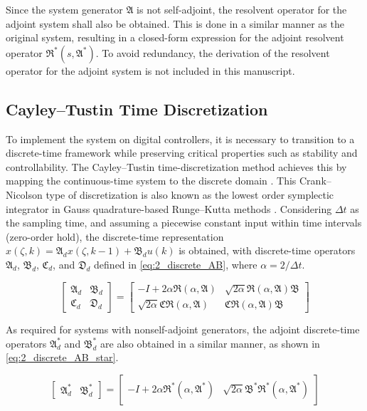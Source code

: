 Since the system generator $\mathfrak{A}$ is not self-adjoint, the resolvent operator for the adjoint system shall also be obtained. This is done in a similar manner as the original system, resulting in a closed-form expression for the adjoint resolvent operator $\mathfrak{R}^*(s, \mathfrak{A}^*)$. %
To avoid redundancy, the derivation of the resolvent operator for the adjoint system is not included in this manuscript.

\subsection{Cayley–Tustin Time Discretization}

To implement the system on digital controllers, it is necessary to transition to a discrete-time framework while preserving critical properties such as stability and controllability. The Cayley–Tustin time-discretization method achieves this by mapping the continuous-time system to the discrete domain \cite{havu2007cayley, xu2017linear}. This Crank–Nicolson type of discretization is also known as the lowest order symplectic integrator in Gauss quadrature-based Runge–Kutta methods \cite{hairer2006geometric}. Considering $\Delta t$ as the sampling time, and assuming a piecewise constant input within time intervals (zero-order hold), the discrete-time representation ${x}(\zeta, k) = \mathfrak{A}_d {x}(\zeta, k-1) + \mathfrak{B}_d u(k)$ is obtained, with discrete-time operators $\mathfrak{A}_d$, $\mathfrak{B}_d$, $\mathfrak{C}_d$, and $\mathfrak{D}_d$ defined in \eqref{eq:2_discrete_AB}, where $\alpha = 2/{\Delta t}$.

\begin{equation} \label{eq:2_discrete_AB}
    \begin{bmatrix}
        \mathfrak{A}_d & \mathfrak{B}_d \\
        \mathfrak{C}_d & \mathfrak{D}_d
    \end{bmatrix} = 
    \begin{bmatrix}
        -I + 2\alpha \mathfrak{R}(\alpha, \mathfrak{A}) & \sqrt{2\alpha} \mathfrak{R}(\alpha, \mathfrak{A}) \mathfrak{B} \\
        \sqrt{2\alpha} \mathfrak{C} \mathfrak{R}(\alpha, \mathfrak{A}) & \mathfrak{C} \mathfrak{R}(\alpha, \mathfrak{A}) \mathfrak{B}
    \end{bmatrix}
\end{equation}

As required for systems with nonself-adjoint generators, the adjoint discrete-time operators $\mathfrak{A}_d^*$ and $\mathfrak{B}_d^*$ are also obtained in a similar manner, as shown in \eqref{eq:2_discrete_AB_star}.

\begin{equation} \label{eq:2_discrete_AB_star}
    \begin{bmatrix}
        \mathfrak{A}_d^* & \mathfrak{B}_d^*
    \end{bmatrix} = 
    \begin{bmatrix}
        -I + 2\alpha \mathfrak{R}^*(\alpha, \mathfrak{A}^*) & \sqrt{2\alpha} \mathfrak{B}^* \mathfrak{R}^*(\alpha, \mathfrak{A}^*)
    \end{bmatrix}
\end{equation}
